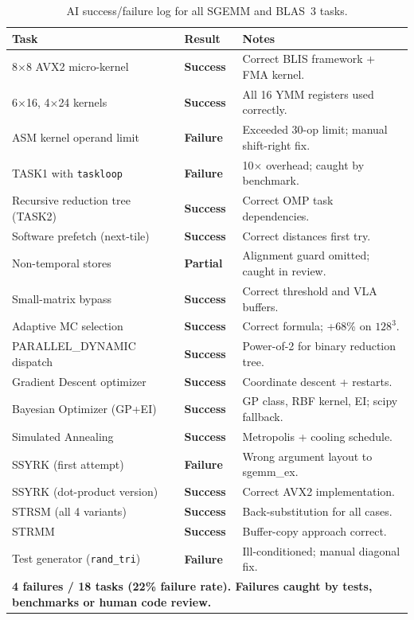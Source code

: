 \documentclass[11pt,a4paper]{article}
\begin{document}
\begin{table}[h]
\centering
\caption{AI success/failure log for all SGEMM and BLAS~3 tasks.}
\label{tab:ai_audit}
\small
\begin{tabular}{p{5cm}p{2cm}p{6.5cm}}
\toprule
Task & Result & Notes\\
\midrule
8$\times$8 AVX2 micro-kernel    & \textbf{Success}  & Correct BLIS framework + FMA kernel.\\
6$\times$16, 4$\times$24 kernels & \textbf{Success} & All 16 YMM registers used correctly.\\
ASM kernel operand limit         & \textbf{\color{red}Failure} & Exceeded 30-op limit; manual shift-right fix.\\
TASK1 with \texttt{taskloop}     & \textbf{\color{red}Failure} & 10$\times$ overhead; caught by benchmark.\\
Recursive reduction tree (TASK2) & \textbf{Success}  & Correct OMP task dependencies.\\
Software prefetch (next-tile)    & \textbf{Success}  & Correct distances first try.\\
Non-temporal stores              & \textbf{Partial}  & Alignment guard omitted; caught in review.\\
Small-matrix bypass              & \textbf{Success}  & Correct threshold and VLA buffers.\\
Adaptive MC selection            & \textbf{Success}  & Correct formula; +68\% on $128^3$.\\
PARALLEL\_DYNAMIC dispatch       & \textbf{Success}  & Power-of-2 for binary reduction tree.\\
Gradient Descent optimizer       & \textbf{Success}  & Coordinate descent + restarts.\\
Bayesian Optimizer (GP+EI)       & \textbf{Success}  & GP class, RBF kernel, EI; scipy fallback.\\
Simulated Annealing              & \textbf{Success}  & Metropolis + cooling schedule.\\
SSYRK (first attempt)            & \textbf{\color{red}Failure} & Wrong argument layout to sgemm\_ex.\\
SSYRK (dot-product version)      & \textbf{Success}  & Correct AVX2 implementation.\\
STRSM (all 4 variants)           & \textbf{Success}  & Back-substitution for all cases.\\
STRMM                            & \textbf{Success}  & Buffer-copy approach correct.\\
Test generator (\texttt{rand\_tri}) & \textbf{\color{red}Failure} & Ill-conditioned; manual diagonal fix.\\
\midrule
\multicolumn{3}{l}{\textbf{4 failures / 18 tasks (22\% failure rate). Failures caught by tests, benchmarks or human code review.}}\\
\bottomrule
\end{tabular}
\end{table}
\end{document}
